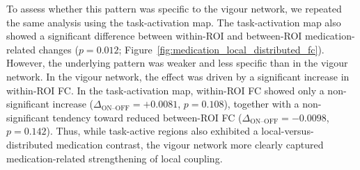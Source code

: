 \documentclass[utf8]{FrontiersinHarvard}
\begin{document}
To assess whether this pattern was specific to the vigour network, we repeated the same analysis using the task-activation map. The task-activation map also showed a significant difference between within-ROI and between-ROI medication-related changes (\(p=0.012\); Figure~\ref{fig:medication_local_distributed_fc}). However, the underlying pattern was weaker and less specific than in the vigour network. In the vigour network, the effect was driven by a significant increase in within-ROI FC. In the task-activation map, within-ROI FC showed only a non-significant increase (\(\Delta_{\text{ON–OFF}}=+0.0081\), \(p=0.108\)), together with a non-significant tendency toward reduced between-ROI FC (\(\Delta_{\text{ON–OFF}}=-0.0098\), \(p=0.142\)). Thus, while task-active regions also exhibited a local-versus-distributed medication contrast, the vigour network more clearly captured medication-related strengthening of local coupling.
\end{document}
